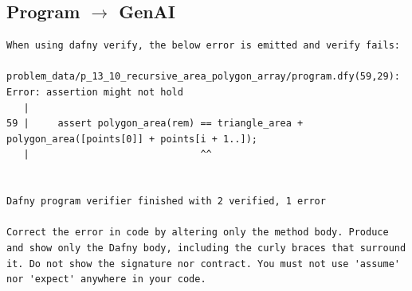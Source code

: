 \documentclass{article}
\begin{document}
\subsection*{Program $\rightarrow$ GenAI}
\begin{lstlisting}
When using dafny verify, the below error is emitted and verify fails:

problem_data/p_13_10_recursive_area_polygon_array/program.dfy(59,29): Error: assertion might not hold
   |
59 |     assert polygon_area(rem) == triangle_area + polygon_area([points[0]] + points[i + 1..]);
   |                              ^^


Dafny program verifier finished with 2 verified, 1 error

Correct the error in code by altering only the method body. Produce and show only the Dafny body, including the curly braces that surround it. Do not show the signature nor contract. You must not use 'assume' nor 'expect' anywhere in your code.
\end{lstlisting}
\end{document}
